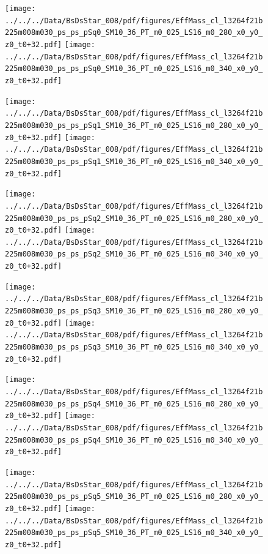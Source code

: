 \documentclass[a4paper,10pt]{article}
\begin{document}
\begin{figure}[p]
 \texttt{[image: ../../../Data/BsDsStar\_008/pdf/figures/EffMass\_cl\_l3264f21b225m008m030\_ps\_ps\_pSq0\_SM10\_36\_PT\_m0\_025\_LS16\_m0\_280\_x0\_y0\_z0\_t0+32.pdf]} 
 \texttt{[image: ../../../Data/BsDsStar\_008/pdf/figures/EffMass\_cl\_l3264f21b225m008m030\_ps\_ps\_pSq0\_SM10\_36\_PT\_m0\_025\_LS16\_m0\_340\_x0\_y0\_z0\_t0+32.pdf]} 
 \end{figure}
\begin{figure}[p]
 \texttt{[image: ../../../Data/BsDsStar\_008/pdf/figures/EffMass\_cl\_l3264f21b225m008m030\_ps\_ps\_pSq1\_SM10\_36\_PT\_m0\_025\_LS16\_m0\_280\_x0\_y0\_z0\_t0+32.pdf]} 
 \texttt{[image: ../../../Data/BsDsStar\_008/pdf/figures/EffMass\_cl\_l3264f21b225m008m030\_ps\_ps\_pSq1\_SM10\_36\_PT\_m0\_025\_LS16\_m0\_340\_x0\_y0\_z0\_t0+32.pdf]} 
 \end{figure}
\begin{figure}[p]
 \texttt{[image: ../../../Data/BsDsStar\_008/pdf/figures/EffMass\_cl\_l3264f21b225m008m030\_ps\_ps\_pSq2\_SM10\_36\_PT\_m0\_025\_LS16\_m0\_280\_x0\_y0\_z0\_t0+32.pdf]} 
 \texttt{[image: ../../../Data/BsDsStar\_008/pdf/figures/EffMass\_cl\_l3264f21b225m008m030\_ps\_ps\_pSq2\_SM10\_36\_PT\_m0\_025\_LS16\_m0\_340\_x0\_y0\_z0\_t0+32.pdf]} 
 \end{figure}
\clearpage
\begin{figure}[p]
 \texttt{[image: ../../../Data/BsDsStar\_008/pdf/figures/EffMass\_cl\_l3264f21b225m008m030\_ps\_ps\_pSq3\_SM10\_36\_PT\_m0\_025\_LS16\_m0\_280\_x0\_y0\_z0\_t0+32.pdf]} 
 \texttt{[image: ../../../Data/BsDsStar\_008/pdf/figures/EffMass\_cl\_l3264f21b225m008m030\_ps\_ps\_pSq3\_SM10\_36\_PT\_m0\_025\_LS16\_m0\_340\_x0\_y0\_z0\_t0+32.pdf]} 
 \end{figure}
\begin{figure}[p]
 \texttt{[image: ../../../Data/BsDsStar\_008/pdf/figures/EffMass\_cl\_l3264f21b225m008m030\_ps\_ps\_pSq4\_SM10\_36\_PT\_m0\_025\_LS16\_m0\_280\_x0\_y0\_z0\_t0+32.pdf]} 
 \texttt{[image: ../../../Data/BsDsStar\_008/pdf/figures/EffMass\_cl\_l3264f21b225m008m030\_ps\_ps\_pSq4\_SM10\_36\_PT\_m0\_025\_LS16\_m0\_340\_x0\_y0\_z0\_t0+32.pdf]} 
 \end{figure}
\begin{figure}[p]
 \texttt{[image: ../../../Data/BsDsStar\_008/pdf/figures/EffMass\_cl\_l3264f21b225m008m030\_ps\_ps\_pSq5\_SM10\_36\_PT\_m0\_025\_LS16\_m0\_280\_x0\_y0\_z0\_t0+32.pdf]} 
 \texttt{[image: ../../../Data/BsDsStar\_008/pdf/figures/EffMass\_cl\_l3264f21b225m008m030\_ps\_ps\_pSq5\_SM10\_36\_PT\_m0\_025\_LS16\_m0\_340\_x0\_y0\_z0\_t0+32.pdf]} 
 \end{figure}
\clearpage
\clearpage
\end{document}
